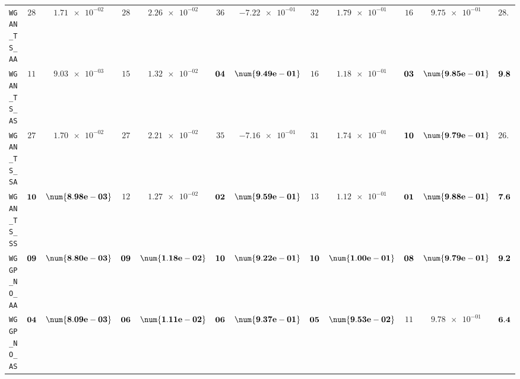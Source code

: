 \begin{xltabular}{\textwidth}{l||cC|cC|cC|cC|cC||c}
	\texttt{WGAN\_TS\_AA} & $ 28$ & $ \num{1.71e-02}$ & $ 28$ & $ \num{2.26e-02}$ & $ 36$ & $ \num{-7.22e-01}$ & $ 32$ & $ \num{1.79e-01}$ & $ 16$ & $ \num{9.75e-01}$ & $ 28.0$  \\
	\texttt{WGAN\_TS\_AS} & $ 11$ & $ \num{9.03e-03}$ & $ 15$ & $ \num{1.32e-02}$ & $\bf 04$ & $\bf \num{9.49e-01}$ & $ 16$ & $ \num{1.18e-01}$ & $\bf 03$ & $\bf \num{9.85e-01}$ & $\bf 9.8$  \\
	\texttt{WGAN\_TS\_SA} & $ 27$ & $ \num{1.70e-02}$ & $ 27$ & $ \num{2.21e-02}$ & $ 35$ & $ \num{-7.16e-01}$ & $ 31$ & $ \num{1.74e-01}$ & $\bf 10$ & $\bf \num{9.79e-01}$ & $ 26.0$  \\
	\texttt{WGAN\_TS\_SS} & $\bf 10$ & $\bf \num{8.98e-03}$ & $ 12$ & $ \num{1.27e-02}$ & $\bf 02$ & $\bf \num{9.59e-01}$ & $ 13$ & $ \num{1.12e-01}$ & $\bf 01$ & $\bf \num{9.88e-01}$ & $\bf 7.6$  \\ \midrule
	\texttt{WGGP\_NO\_AA} & $\bf 09$ & $\bf \num{8.80e-03}$ & $\bf 09$ & $\bf \num{1.18e-02}$ & $\bf 10$ & $\bf \num{9.22e-01}$ & $\bf 10$ & $\bf \num{1.00e-01}$ & $\bf 08$ & $\bf \num{9.79e-01}$ & $\bf 9.2$  \\
	\texttt{WGGP\_NO\_AS} & $\bf 04$ & $\bf \num{8.09e-03}$ & $\bf 06$ & $\bf \num{1.11e-02}$ & $\bf 06$ & $\bf \num{9.37e-01}$ & $\bf 05$ & $\bf \num{9.53e-02}$ & $ 11$ & $ \num{9.78e-01}$ & $\bf 6.4$  \\

\end{xltabular}
